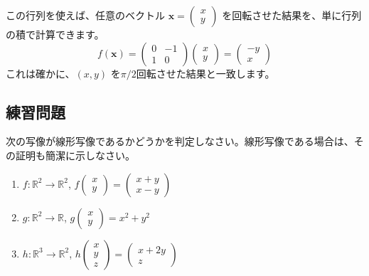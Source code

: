 \begin{ex}[2次元平面上の回転写像の表現行列]
この行列を使えば、任意のベクトル $\bm{x} = \begin{pmatrix} x \\ y \end{pmatrix}$ を回転させた結果を、単に行列の積で計算できます。
\[f(\bm{x}) = \begin{pmatrix} 0 & -1 \\ 1 & 0 \end{pmatrix} \begin{pmatrix} x \\ y \end{pmatrix} = \begin{pmatrix} -y \\ x \end{pmatrix}\]
これは確かに、$(x,y)$ を$\pi/2$回転させた結果と一致します。
\end{ex}

\subsection{練習問題}

\begin{quiz}
次の写像が線形写像であるかどうかを判定しなさい。線形写像である場合は、その証明も簡潔に示しなさい。
\begin{enumerate}
\item $f: \mathbb{R}^2 \to \mathbb{R}^2$, $f\begin{pmatrix} x \\ y \end{pmatrix} = \begin{pmatrix} x+y \\ x-y \end{pmatrix}$
\item $g: \mathbb{R}^2 \to \mathbb{R}$, $g\begin{pmatrix} x \\ y \end{pmatrix} = x^2 + y^2$
\item $h: \mathbb{R}^3 \to \mathbb{R}^2$, $h\begin{pmatrix} x \\ y \\ z \end{pmatrix} = \begin{pmatrix} x+2y \\ z \end{pmatrix}$
\end{enumerate}
\end{quiz}

